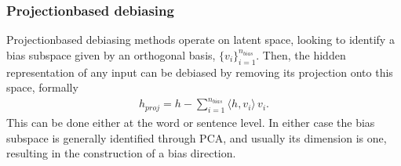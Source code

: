 \documentclass[letterpaper,10pt,english]{sphinxmanual}
\begin{document}
\begin{fulllineitems}
\begin{sphinxVerbatim}[commandchars=\\\{\}]
   
 \PYG{p}{[}  \PYG{p}{]}
\end{sphinxVerbatim}

\end{fulllineitems}



\subsubsection{Projection\sphinxhyphen{}based debiasing}
\label{\detokenize{algorithms_preprocessors:projection-based-debiasing}}\label{\detokenize{algorithms_preprocessors:emb}}
\sphinxAtStartPar
Projection\sphinxhyphen{}based debiasing methods  operate on latent space, looking to identify a bias subspace given by an
orthogonal basis, \(\{v_i\}_{i=1}^{n_{bias}}\). Then, the hidden representation of any input can be debiased by removing its projection onto this space, formally
\begin{equation*}
\begin{split}h_{proj} = h - \sum_{i = 1}^{n_{bias} } \langle h, v_i \rangle \, v_i.\end{split}
\end{equation*}
\sphinxAtStartPar
This can be done either at the word or sentence level. In either case the bias subspace is generally identified through PCA,
and usually its dimension is one, resulting in the construction of a bias direction.
\end{document}
